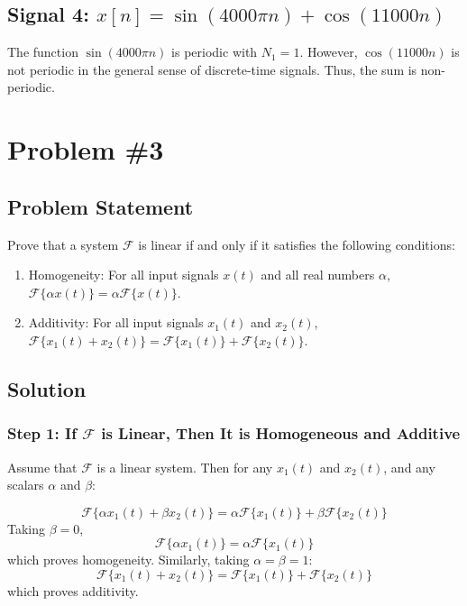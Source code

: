 \documentclass{article}
\begin{document}
\subsection*{Signal 4: \( x[n] = \sin(4000\pi n) + \cos(11000n) \)}
The function \( \sin(4000\pi n) \) is periodic with \( N_1 = 1 \). However, \( \cos(11000n) \) is not periodic in the general sense of discrete-time signals. Thus, the sum is non-periodic.

\newpage
\section*{Problem \#3}

\subsection*{Problem Statement}
Prove that a system \( \mathcal{F} \) is linear if and only if it satisfies the following conditions:
\begin{enumerate}
    \item Homogeneity: For all input signals \( x(t) \) and all real numbers \( \alpha \), \( \mathcal{F}\{\alpha x(t)\} = \alpha \mathcal{F}\{x(t)\} \).
    \item Additivity: For all input signals \( x_1(t) \) and \( x_2(t) \), \( \mathcal{F}\{x_1(t) + x_2(t)\} = \mathcal{F}\{x_1(t)\} + \mathcal{F}\{x_2(t)\} \).
\end{enumerate}

\subsection*{Solution}

\subsubsection*{Step 1: If \( \mathcal{F} \) is Linear, Then It is Homogeneous and Additive}

Assume that \( \mathcal{F} \) is a linear system. Then for any \( x_1(t) \) and \( x_2(t) \), and any scalars \( \alpha \) and \( \beta \):

\[
\mathcal{F}\{\alpha x_1(t) + \beta x_2(t)\} = \alpha \mathcal{F}\{x_1(t)\} + \beta \mathcal{F}\{x_2(t)\}
\]
Taking \( \beta = 0 \), 
\[
\mathcal{F}\{\alpha x_1(t)\} = \alpha \mathcal{F}\{x_1(t)\}
\]
which proves homogeneity.
\newline
\newline Similarly, taking \( \alpha = \beta = 1 \):
\[
\mathcal{F}\{x_1(t) + x_2(t)\} = \mathcal{F}\{x_1(t)\} + \mathcal{F}\{x_2(t)\}
\]
which proves additivity.
\end{document}
